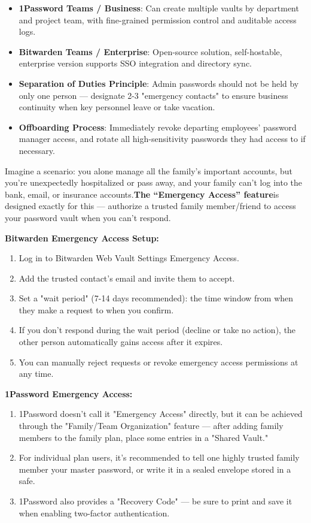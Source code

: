 \begin{itemize}
  \item \textbf{1Password Teams / Business}: Can create multiple vaults by department and project team, with fine-grained permission control and auditable access logs.
  \item \textbf{Bitwarden Teams / Enterprise}: Open-source solution, self-hostable, enterprise version supports SSO integration and directory sync.
  \item \textbf{Separation of Duties Principle}: Admin passwords should not be held by only one person — designate 2-3 "emergency contacts" to ensure business continuity when key personnel leave or take vacation.
  \item \textbf{Offboarding Process}: Immediately revoke departing employees' password manager access, and rotate all high-sensitivity passwords they had access to if necessary.
\end{itemize}


Imagine a scenario: you alone manage all the family's important accounts, but you're unexpectedly hospitalized or pass away, and your family can't log into the bank, email, or insurance accounts.\textbf{The “Emergency Access” feature}is designed exactly for this — authorize a trusted family member/friend to access your password vault when you can't respond.

\textbf{Bitwarden Emergency Access Setup:}

\begin{enumerate}
  \item Log in to Bitwarden Web Vault Settings Emergency Access.
  \item Add the trusted contact's email and invite them to accept.
  \item Set a "wait period" (7-14 days recommended): the time window from when they make a request to when you confirm.
  \item If you don't respond during the wait period (decline or take no action), the other person automatically gains access after it expires.
  \item You can manually reject requests or revoke emergency access permissions at any time.
\end{enumerate}

\textbf{1Password Emergency Access:}

\begin{enumerate}
  \item 1Password doesn't call it "Emergency Access" directly, but it can be achieved through the "Family/Team Organization" feature — after adding family members to the family plan, place some entries in a "Shared Vault."
  \item For individual plan users, it's recommended to tell one highly trusted family member your master password, or write it in a sealed envelope stored in a safe.
  \item 1Password also provides a "Recovery Code" — be sure to print and save it when enabling two-factor authentication.
\end{enumerate}

